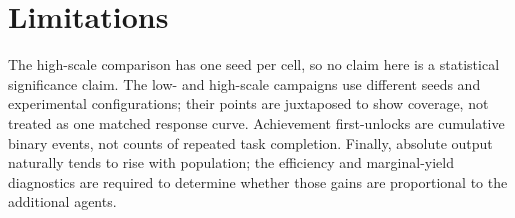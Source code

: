 \documentclass[10pt]{article}
\begin{document}
\section{Limitations}

The high-scale comparison has one seed per cell, so no claim here is a
statistical significance claim.  The low- and high-scale campaigns use
different seeds and experimental configurations; their points are juxtaposed
to show coverage, not treated as one matched response curve.  Achievement
first-unlocks are cumulative binary events, not counts of repeated task
completion.  Finally, absolute output naturally tends to rise with population;
the efficiency and marginal-yield diagnostics are required to determine
whether those gains are proportional to the additional agents.
\end{document}
